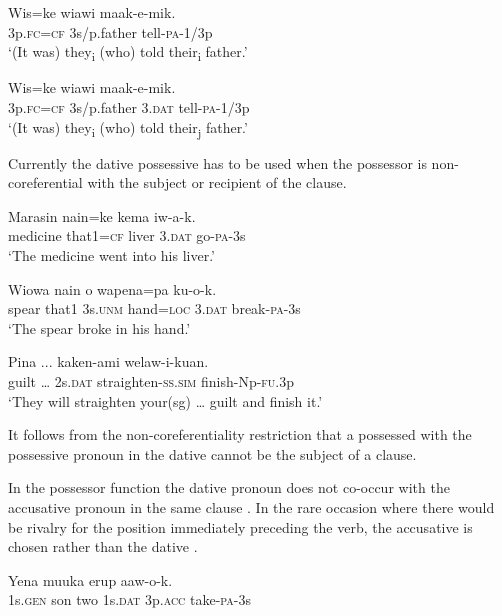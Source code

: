 \ea%
\label{ex:3:x1798}
\gll Wis=ke wiawi maak-e-mik. \\
3p.\textsc{fc}=\textsc{cf} 3s/p.father tell-\textsc{pa}-1/3p\\
\glt`(It was) they\textsubscript{i} (who) told their\textsubscript{i} father.'
\z

\ea%
\label{ex:3:x1799}
\gll Wis=ke wiawi  maak-e-mik. \\
3p.\textsc{fc}=\textsc{cf} 3s/p.father 3.\textsc{dat} tell-\textsc{pa}-1/3p\\
\glt`(It was) they\textsubscript{i} (who) told their\textsubscript{j} father.'
\z

Currently the dative possessive has to be used when the possessor is non-coreferential with the subject or recipient of the clause.

\ea%
\label{ex:3:x588}
\gll Marasin nain=ke kema  iw-a-k. \\
medicine that1=\textsc{cf} liver 3.\textsc{dat} go-\textsc{pa}-3s\\
\glt`The medicine went into his liver.'
\z

\ea%
\label{ex:3:x853}
\gll Wiowa nain o wapena=pa   ku-o-k. \\
spear that1 3s.\textsc{unm} hand=\textsc{loc} 3.\textsc{dat} break-\textsc{pa}-3s\\
\glt`The spear broke in his hand.'
\z

\ea%
\label{ex:3:x1794}
\gll Pina ...  kaken-ami welaw-i-kuan. \\
guilt {\dots} 2s.\textsc{dat} straighten-\textsc{ss}.\textsc{sim} finish-Np-\textsc{fu}.3p\\
\glt`They will straighten your(sg) {\dots} guilt and finish it.'
\z

It follows from the non-coreferentiality restriction that a possessed  with the possessive pronoun in the dative cannot be the subject of a clause. 

In the possessor function the dative pronoun does not co-occur with the accusative pronoun in the same clause . In the rare occasion where there would be rivalry for the position immediately preceding the verb, the accusative is chosen  rather than the dative . 

\ea%
\label{ex:3:x584}
\gll *Yena muuka erup   aaw-o-k. \\
1s.\textsc{gen} son two 1s.\textsc{dat} 3p.\textsc{acc} take-\textsc{pa}-3s\\
\glt %
\z

